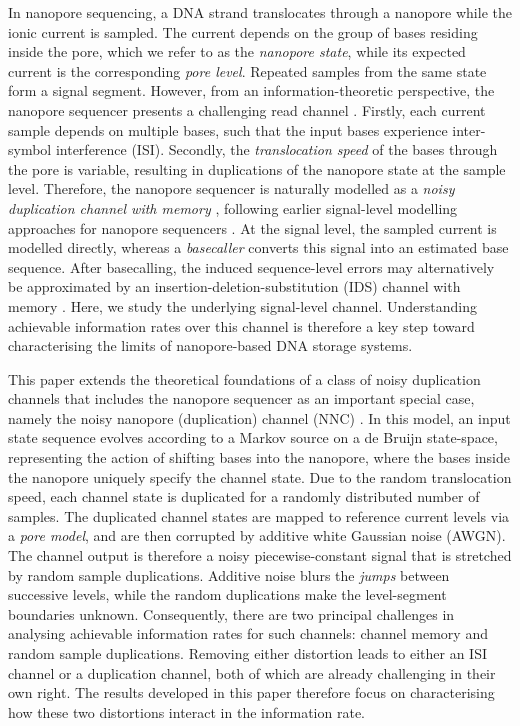 \documentclass[onecolumn]{IEEEtran}
\theoremstyle{definition}
\begin{document}
{In nanopore sequencing, a DNA strand translocates through a
nanopore while the ionic current is sampled. The current depends on the group
of bases residing inside the pore, which we refer to as the \emph{nanopore
state}, while its expected current is the corresponding \emph{pore level}.
Repeated samples from the same state form a signal segment.}
However, from an information-theoretic perspective, the nanopore sequencer
presents a challenging read channel \cite{BITSDNA}. Firstly,
{each current sample depends on multiple bases, such that}
the input bases experience inter-symbol interference (ISI). Secondly, the
{\em translocation speed} of the bases through the pore is variable, resulting
in duplications of the nanopore state at the sample level. Therefore, the
nanopore sequencer is naturally modelled as a {\em noisy duplication channel
with memory} \cite{McBain2022,McBain2024a}, following earlier signal-level
modelling approaches for nanopore sequencers \cite{Mao2018}.
{At the signal level, the sampled current is modelled directly,
whereas a \emph{basecaller} converts this signal into an estimated base
sequence.} After basecalling, the induced sequence-level errors may
alternatively be approximated by an insertion-deletion-substitution (IDS)
channel with memory \cite{Hamoum2023,Welter2026}. Here, we study the underlying
signal-level channel. Understanding achievable information rates over this
channel is therefore a key step toward characterising the limits of
nanopore-based DNA storage systems.

This paper extends the theoretical foundations of a class of noisy duplication
channels that includes the nanopore sequencer as an important special case,
namely the noisy nanopore (duplication) channel (NNC)
\cite{McBain2022,McBain2024a}. In this model, an input state sequence evolves
according to a Markov source on a de Bruijn state-space, representing the
action of shifting bases into the nanopore, where the bases inside the nanopore
uniquely specify the channel state. Due to the random translocation speed, each
channel state is duplicated for a randomly distributed number of samples. The
duplicated channel states are mapped to reference current levels via a {\em pore
model}, and are then corrupted by additive white Gaussian noise (AWGN). The
channel output is therefore a noisy piecewise-constant signal that is stretched
by random sample duplications. Additive noise blurs the {\em jumps} between
successive levels, while the random duplications make the level-segment
boundaries unknown. Consequently, there are two principal challenges in
analysing achievable information rates for such channels: channel memory and
random sample duplications. Removing either distortion leads to either an ISI
channel or a duplication channel, both of which are already challenging in
their own right. The results developed in this paper therefore focus on
characterising how these two distortions interact in the information rate.
\end{document}
